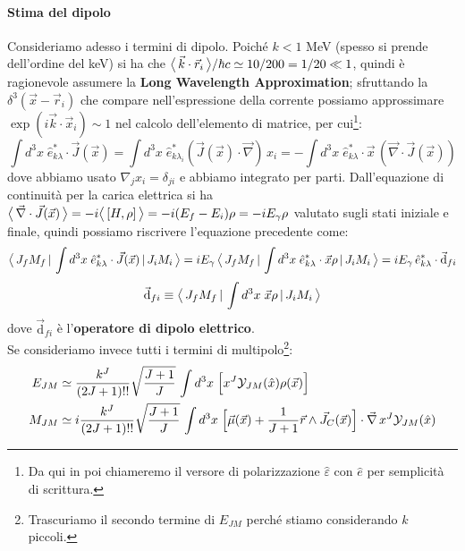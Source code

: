 \paragraph{Stima del dipolo} Consideriamo adesso i termini di dipolo. Poiché $k< 1$ MeV (spesso si prende dell'ordine del keV) si ha che $\bigl\langle\, \vec{k}\cdot\vec{r}_i\, \bigr\rangle/\hbar c\simeq 10/200 = 1/20\ll 1$, quindi è ragionevole assumere la \textbf{Long Wavelength Approximation}; sfruttando la $\delta^3(\vec{x}-\vec{r}_i)$ che compare nell'espressione della corrente possiamo approssimare $\exp{(i\vec{k}\cdot\vec{x}_i)}\sim 1$ nel calcolo dell'elemento di matrice, per cui\footnote{Da qui in poi chiameremo il versore di polarizzazione $\widehat{\varepsilon}$ con $\hat{e}$ per semplicità di scrittura.}:
$$\int d^3x\; \hat{e}_{k\lambda}^* \cdot \vec{J}(\vec{x}) = \int d^3x\; \hat{e}_{k\lambda_i}^*  (\vec{J}(\vec{x})\cdot \vec{\nabla})\,x_i = - \int d^3x \; \hat{e}_{k\lambda}^* \cdot \vec{x}\, (\vec{\nabla}\cdot\vec{J}(\vec{x})) $$
dove abbiamo usato $\nabla_j x_i = \delta_{ji}$ e abbiamo integrato per parti. Dall'equazione di continuità per la carica elettrica si ha $\bigl\langle\, \vec{\nabla}\cdot\vec{J}(\vec{x})\, \bigr\rangle = -i\bigl\langle\, [H,\rho]\, \bigr\rangle = -i(E_f-E_i)\rho = -i E_\gamma \rho$  valutato sugli stati iniziale e finale, quindi possiamo riscrivere l'equazione precedente come:
$$\bigl\langle\, J_fM_f\, |\,\int d^3x \; \hat{e}^*_{k\lambda}\cdot \vec{J}(\vec{x})\, |\,J_iM_i\, \bigr\rangle = iE_\gamma \, \bigl\langle\, J_fM_f\, |\,\int d^3x \; \hat{e}^*_{k\lambda}\cdot \vec{x}\rho\, |\,J_iM_i\, \bigr\rangle = i E_\gamma \, \hat{e}^*_{k\lambda} \cdot \vec{\mathrm{d}}_{fi}$$
$$\vec{\mathrm{d}}_{fi} \equiv \bigl\langle\, J_fM_f\, |\,\int d^3x \; \vec{x}\rho\, |\,J_iM_i\, \bigr\rangle$$
dove $\vec{\mathrm{d}}_{fi}$ è l'\textbf{operatore di dipolo elettrico}.\\
Se consideriamo invece tutti i termini di multipolo\footnote{Trascuriamo il secondo termine di $E_{JM}$ perché stiamo considerando $k$ piccoli.}:
\begin{displaymath}
\begin{aligned}
E_{JM} &\simeq \frac{k^J}{(2J+1)!!} \sqrt{\frac{J+1}{J}}\, \int d^3x \; \Bigl [ x^J \mathcal{Y}_{JM}(\hat{x})\rho(\vec{x}) \Bigr ] \\
M_{JM} &\simeq i\frac{k^J}{(2J+1)!!} \sqrt{\frac{J+1}{J}}\, \int d^3x \; \Bigl [ \vec{\mu}(\vec{x}) + \frac{1}{J+1} \vec{r}\land \vec{J}_C(\vec{x}) \Bigr ]\cdot \vec{\nabla}\,x^J\mathcal{Y}_{JM}(\hat{x})
\end{aligned}
\end{displaymath}
